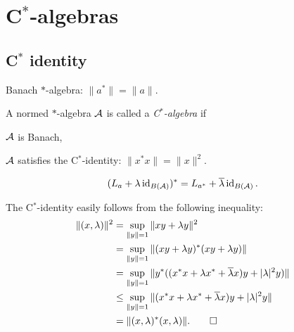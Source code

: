 \documentclass{../note}
\begin{document}
\chapter{C$^*$-algebras}

\section{C$^*$ identity}

Banach $*$-algebra: $\|a^*\|=\|a\|$.

\begin{prb}[C$^*$ identity]
A normed $*$-algebra $\cA$ is called a \emph{C$^*$-algebra} if
\begin{parts}
\item $\cA$ is Banach,
\item $\cA$ satisfies the C$^*$-identity: $\|x^*x\|=\|x\|^2$.
\end{parts}
\end{prb}


\begin{prb}
\[(L_a+\lambda\id_{B(\cA)})^*=L_{a^*}+\bar\lambda\id_{B(\cA)}.\]
\end{prb}
\begin{pf}
The C$^*$-identity easily follows from the following inequality:
\begin{align*}
\|(x,\lambda)\|^2&=\sup_{\|y\|=1}\|xy+\lambda y\|^2\\
&=\sup_{\|y\|=1}\|(xy+\lambda y)^*(xy+\lambda y)\|\\
&=\sup_{\|y\|=1}\|y^*((x^*x+\lambda x^*+\bar\lambda x)y+|\lambda|^2y)\|\\
&\le\sup_{\|y\|=1}\|(x^*x+\lambda x^*+\bar\lambda x)y+|\lambda|^2y\|\\
&=\|(x,\lambda)^*(x,\lambda)\|.\qedhere
\end{align*}
\end{pf}
\end{document}
